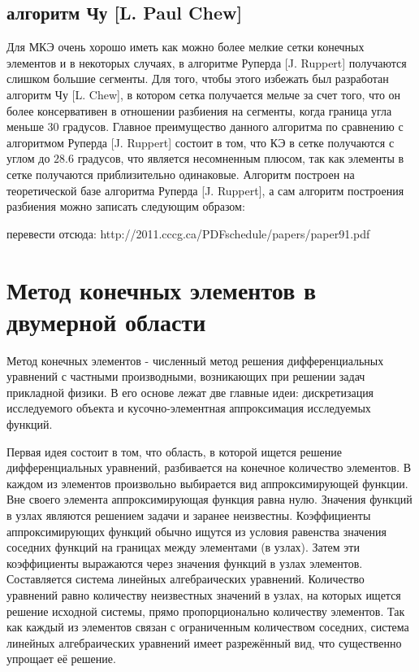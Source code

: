 \documentclass[14pt]{extreport}
\begin{document}
\section{алгоритм Чу [L. Paul Chew]}

Для МКЭ очень хорошо иметь как можно более мелкие сетки конечных элементов и в некоторых случаях, в алгоритме Руперда [J. Ruppert] получаются слишком большие сегменты. Для того, чтобы этого избежать был разработан алгоритм Чу [L. Chew], в котором сетка получается мельче за счет того, что он более консервативен в отношении разбиения на сегменты, когда граница угла меньше $30$ градусов. Главное преимущество данного алгоритма по сравнению с алгоритмом Руперда [J. Ruppert] состоит в том, что КЭ в сетке получаются с углом до $28.6$ градусов, что является несомненным плюсом, так как элементы в сетке получаются приблизительно одинаковые. Алгоритм построен на теоретической базе алгоритма Руперда [J. Ruppert], а сам алгоритм построения разбиения можно записать следующим образом:







перевести отсюда:
http://2011.cccg.ca/PDFschedule/papers/paper91.pdf





\chapter{Метод конечных элементов в двумерной области}

Метод конечных элементов \cite{Pankratov:FEM,Zenkevich:1986:FEM} - численный метод решения дифференциальных уравнений с частными производными, возникающих при решении задач прикладной физики.
	В его основе лежат две главные идеи: дискретизация исследуемого объекта и кусочно-элементная аппроксимация исследуемых функций.

Первая идея состоит в том, что область, в которой ищется решение дифференциальных уравнений, разбивается на конечное количество элементов. В каждом из элементов произвольно выбирается вид аппроксимирующей функции. Вне своего элемента аппроксимирующая функция равна нулю. Значения функций в узлах являются решением задачи и заранее неизвестны. Коэффициенты аппроксимирующих функций обычно ищутся из условия равенства значения соседних функций на границах между элементами (в узлах). Затем эти коэффициенты выражаются через значения функций в узлах элементов. Составляется система линейных алгебраических уравнений. Количество уравнений равно количеству неизвестных значений в узлах, на которых ищется решение исходной системы, прямо пропорционально количеству элементов. Так как каждый из элементов связан с ограниченным количеством соседних, система линейных алгебраических уравнений имеет разрежённый вид, что существенно упрощает её решение. 
\end{document}

